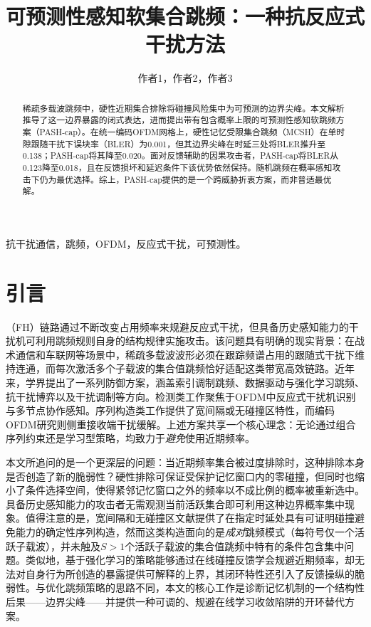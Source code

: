 \documentclass[lettersize,journal]{IEEEtran}
\title{可预测性感知软集合跳频：一种抗反应式干扰方法}
\author{作者1，作者2，作者3}
\begin{document}
\maketitle

\begin{abstract}
稀疏多载波跳频中，硬性近期集合排除将碰撞风险集中为可预测的边界尖峰。本文解析推导了这一边界暴露的闭式表达，进而提出带有包含概率上限的可预测性感知软跳频方案（PASH-cap）。在统一编码OFDM网格上，硬性记忆受限集合跳频（MCSH）在单时隙跟随干扰下误块率（BLER）为0.001，但其边界尖峰在时延三处将BLER推升至0.138；PASH-cap将其降至0.020。面对反馈辅助的因果攻击者，PASH-cap将BLER从0.123降至0.018，且在反馈损坏和延迟条件下该优势依然保持。随机跳频在概率感知攻击下仍为最优选择。综上，PASH-cap提供的是一个跨威胁折衷方案，而非普适最优解。
\end{abstract}

\begin{IEEEkeywords}
抗干扰通信，跳频，OFDM，反应式干扰，可预测性。
\end{IEEEkeywords}

\section{引言}
（FH）链路通过不断改变占用频率来规避反应式干扰，但具备历史感知能力的干扰机可利用跳频规则自身的结构规律实施攻击。该问题具有明确的现实背景：在战术通信和车联网等场景中，稀疏多载波波形必须在跟踪频谱占用的跟随式干扰下维持连通，而每次激活多个子载波的集合值跳频恰好适配这类带宽高效链路。近年来，学界提出了一系列防御方案，涵盖索引调制跳频\cite{shi2022enhanced}、数据驱动与强化学习跳频\cite{zhou2024,zhang2024block,qi2024,cheng2025,chen2026dual}、抗干扰博弈\cite{zhang2024game}以及干扰调制\cite{ma2023}等方向。检测类工作聚焦于OFDM中反应式干扰机识别\cite{altun2022reactive,wesolowski2023detection}与多节点协作感知\cite{li2024}。序列构造类工作提供了宽间隔或无碰撞区特性\cite{shu2024widegap,zheng2025widegap}，而编码OFDM研究则侧重接收端干扰缓解\cite{mailaender2013,kaplan2023,chen2023,mendonca2024channel,wu2026llr}。上述方案共享一个核心理念：无论通过组合序列约束还是学习型策略，均致力于\emph{避免}使用近期频率。

本文所追问的是一个更深层的问题：当近期频率集合被过度排除时，这种排除本身是否创造了新的脆弱性？硬性排除可保证受保护记忆窗口内的零碰撞，但同时也缩小了条件选择空间，使得紧邻记忆窗口之外的频率以不成比例的概率被重新选中。具备历史感知能力的攻击者无需观测当前活跃集合即可利用这种边界概率集中现象。值得注意的是，宽间隔和无碰撞区文献提供了在指定时延处具有可证明碰撞避免能力的确定性序列构造，然而这类构造面向的是\emph{成对}跳频模式（每符号仅一个活跃子载波），并未触及$S>1$个活跃子载波的集合值跳频中特有的条件包含集中问题。类似地，基于强化学习的策略能够通过在线碰撞反馈学会规避近期频率，却无法对自身行为所创造的暴露提供可解释的上界，其闭环特性还引入了反馈操纵的脆弱性。与优化跳频策略的思路不同，本文的核心工作是诊断记忆机制的一个结构性后果——边界尖峰——并提供一种可调的、规避在线学习收敛陷阱的开环替代方案。
\end{document}
